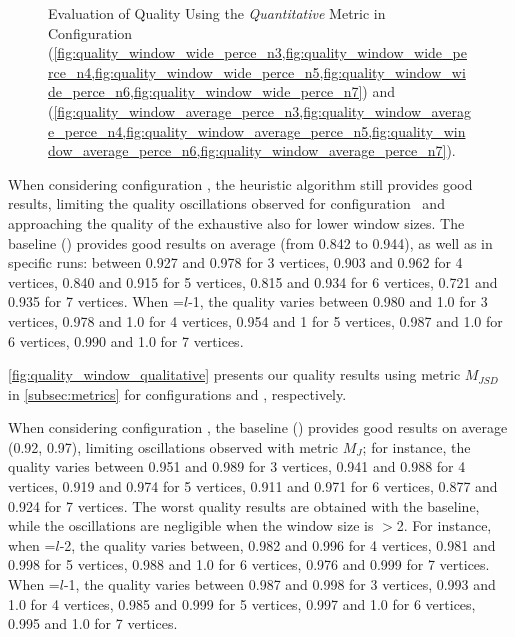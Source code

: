 \begin{figure}[H]
\begin{adjustbox}{minipage=\linewidth,scale=0.75}
\begin{subfigure}{0.45\textwidth}
        \end{subfigure}

        \caption{Evaluation of Quality Using the \emph{Quantitative} Metric in Configuration \wide (\cref{fig:quality_window_wide_perce_n3,fig:quality_window_wide_perce_n4,fig:quality_window_wide_perce_n5,fig:quality_window_wide_perce_n6,fig:quality_window_wide_perce_n7}) and \average (\cref{fig:quality_window_average_perce_n3,fig:quality_window_average_perce_n4,fig:quality_window_average_perce_n5,fig:quality_window_average_perce_n6,fig:quality_window_average_perce_n7}).}  \label{fig:quality_window_perce}
      \end{adjustbox}
    \end{figure}

    When considering configuration \average, the heuristic algorithm still provides good results, limiting the quality oscillations observed for configuration \wide\ and approaching the quality of the exhaustive also for lower window sizes. The baseline () provides good results on average (from 0.842 to 0.944), as well as in specific runs: between 0.927 and 0.978 for 3 vertices, 0.903 and 0.962 for 4 vertices, 0.840 and 0.915 for 5 vertices, 0.815 and 0.934 for 6 vertices, 0.721 and 0.935 for 7 vertices.
    When \windowsize=$l$-1, the quality varies between 0.980 and 1.0 for 3 vertices, 0.978 and 1.0 for 4 vertices, 0.954 and 1 for 5 vertices, 0.987 and 1.0 for 6 vertices, 0.990 and 1.0 for 7 vertices.

    \cref{fig:quality_window_qualitative} {\color{OurColor2}presents} our quality results using metric $M_{JSD}$ in \cref{subsec:metrics} for configurations \wide and \average, respectively.

    When considering configuration \wide, the baseline () provides good results on average (0.92, 0.97), limiting oscillations observed with metric $M_J$; for instance, the quality varies between 0.951 and 0.989 for 3 vertices, 0.941 and 0.988 for 4 vertices, 0.919 and 0.974 for 5 vertices, 0.911 and 0.971 for 6 vertices, 0.877 and 0.924 for 7 vertices.
    The worst quality results are obtained with the baseline, while the oscillations are negligible when the window size is $>$2. For instance, when \windowsize=$l$-2, the quality varies between, 0.982 and 0.996 for 4 vertices, 0.981 and 0.998 for 5 vertices, 0.988 and 1.0 for 6 vertices, 0.976 and 0.999 for 7 vertices. When \windowsize=$l$-1, the quality varies between  0.987 and  0.998 for 3 vertices, 0.993 and 1.0 for 4 vertices, 0.985 and 0.999 for 5 vertices, 0.997 and 1.0 for 6 vertices, 0.995 and 1.0  for 7 vertices.

